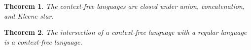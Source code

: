 \documentclass[aps,pra,onecolumn,notitlepage,superscriptaddress]{revtex4-1}
\def\>{\rangle}
\def\<{\langle}
\newtheorem{theo}{Theorem}
\begin{document}


    \begin{theo}
        The context-free languages are closed under union, concatenation, and Kleene star.
    \end{theo}

    \begin{theo}
        The intersection of a context-free language with a regular language is a context-free language.
    \end{theo}
\end{document}
